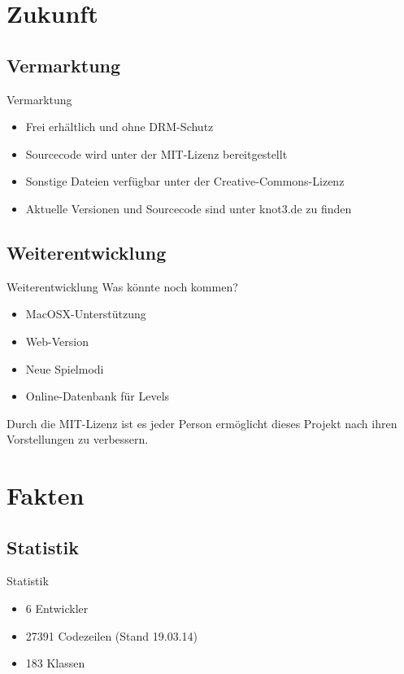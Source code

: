 \documentclass[18pt]{beamer}
\begin{document}
\section{Zukunft}
\subsection{Vermarktung}
\begin{frame}{Vermarktung}
\begin{itemize}
\item Frei erhältlich und ohne DRM-Schutz
\item Sourcecode wird unter der MIT-Lizenz bereitgestellt
\item Sonstige Dateien verfügbar unter der Creative-Commons-Lizenz
\item Aktuelle Versionen und Sourcecode sind unter knot3.de zu finden

\end{itemize}
\end{frame}

\subsection{Weiterentwicklung}
\begin{frame}{Weiterentwicklung}
Was könnte noch kommen?
\begin{itemize}
\item MacOSX-Unterstützung 
\item Web-Version
\item Neue Spielmodi
\item Online-Datenbank für Levels
\end{itemize}

Durch die MIT-Lizenz ist es jeder Person ermöglicht dieses Projekt nach ihren Vorstellungen zu verbessern.
\end{frame}

\section{Fakten}
\subsection{Statistik}
\begin{frame}{Statistik}
\begin{itemize}
\item 6 Entwickler
\item 27391 Codezeilen (Stand 19.03.14)
\item 183 Klassen
\end{itemize}
\end{frame}
\end{document}
